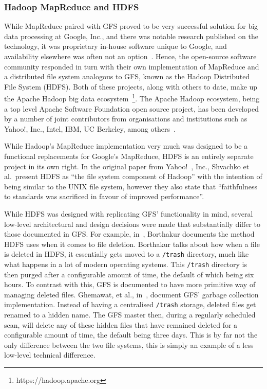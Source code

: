 \documentclass[a4paper,11pt]{article}
\begin{document}


\subsubsection{Hadoop MapReduce and HDFS} %
\label{ssub:hadoop_mapreduce_and_hdfs}

While MapReduce paired with GFS proved to be very successful solution for big data processing at Google, Inc., and
there was notable research published on the technology, it was proprietary in-house software unique to Google, and
availability elsewhere was often not an option~\cite{grossman2009varieties}. Hence, the open-source software community
responded in turn with their own implementation of MapReduce and a distributed file system analogous to GFS, known as the
Hadoop Distributed File System (HDFS). Both of these projects, along with others to date, make up the Apache Hadoop
big data ecosystem~\footnote{https://hadoop.apache.org}. The Apache Hadoop ecosystem, being a top level Apache Software
Foundation open source project, has been developed by a number of joint contributors from organisations and institutions
such as Yahoo!, Inc., Intel, IBM, UC Berkeley, among others~\cite{hadoop_committers}.

While Hadoop's MapReduce implementation very much was designed to be a functional replacements for Google's MapReduce,
HDFS is an entirely separate project in its own right. In the original paper from Yahoo!~\cite{shvachko2010hadoop},
Inc., Shvachko et al.\ present HDFS as ``the file system component of Hadoop'' with the intention of being similar to
the UNIX file system, however they also state that ``faithfulness to standards was sacrificed in favour of improved
performance''.

While HDFS was designed with replicating GFS' functionality in mind, several low-level architectural and design decisions
were made that substantially differ to those documented in GFS. For example, in~\cite{borthakur2007hadoop}, Borthakur
documents the method HDFS uses when it comes to file deletion. Borthakur talks about how when a file is deleted in HDFS,
it essentially gets moved to a \texttt{/trash} directory, much like what happens in a lot of modern operating systems.
This \texttt{/trash} directory is then purged after a configurable amount of time, the default of which being six hours.
To contrast with this, GFS is documented to have more primitive way of managing deleted files. Ghemawat, et al.,
in~\cite{ghemawat_google_2003}, document GFS' garbage collection implementation. Instead of having a centralised
\texttt{/trash} storage, deleted files get renamed to a hidden name. The GFS master then, during a regularly scheduled
scan, will delete any of these hidden files that have remained deleted for a configurable amount of time, the default
being three days. This is by far not the only difference between the two file systems, this is simply an example of a
less low-level technical difference.
\end{document}
